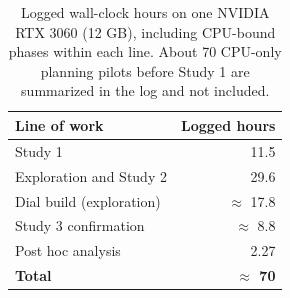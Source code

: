 \documentclass[10pt]{article}
\begin{document}
\begin{table}[htbp]
\centering
\small
\caption{Logged wall-clock hours on one NVIDIA RTX 3060 (12 GB), including CPU-bound phases within each line. About 70 CPU-only planning pilots before Study 1 are summarized in the log and not included.}
\label{tab:6}
\begin{tabularx}{\linewidth}{lr}
\toprule
Line of work & Logged hours \\
\midrule
Study 1 & 11.5 \\
Exploration and Study 2 & 29.6 \\
Dial build (exploration) & $\approx$ 17.8 \\
Study 3 confirmation & $\approx$ 8.8 \\
Post hoc analysis & 2.27 \\
\textbf{Total} & \textbf{$\approx$ 70} \\
\bottomrule
\end{tabularx}
\end{table}
\end{document}
